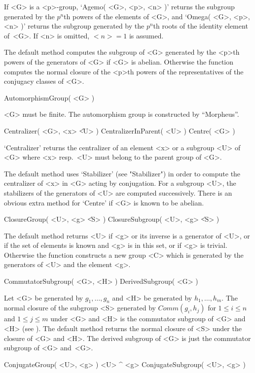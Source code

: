 If  <G> is a <p>-group,   `Agemo( <G>, <p>,   <n> )' returns the subgroup
generated by the $p^n$th powers of the  elements of <G>, and `Omega( <G>,
<p>, <n>  )' returns the  subgroup generated by  the $p^n$th roots of the
identity element of~<G>. If <n> is omitted, $<n>=1$ is assumed.

The  default method computes  the subgroup of <G>  generated by the <p>th
powers of the generators of <G> if <G> is abelian. Otherwise the function
computes the normal closure of the <p>th powers of the representatives of
the conjugacy classes of <G>.

\>AutomorphismGroup( <G> )

<G>   must be  finite.    The   automorphism group  is  constructed    by
``Morpheus''.

\>Centralizer( <G>, <x> \| <U> )
\>CentralizerInParent( <U> )
\>Centre( <G> )

`Centralizer' returns the centralizer of an element <x> or a subgroup <U>
of <G> where <x> resp.~<U> must belong to the parent group of <G>.

The  default  method uses  `Stabilizer'  (see  "Stabilizer") in  order to
compute  the  centralizer  of <x>  in  <G> acting  by conjugation.  For a
subgroup <U>,  the stabilizers of  the  generators  of <U>  are  computed
successively.  There is  an obvious extra  method for  `Centre' if <G> is
known to be abelian.

\>ClosureGroup( <U>, <g> \| <S> )
\>ClosureSubgroup( <U>, <g> \| <S> )

The default method returns  <U> if <g> or its  inverse is a generator  of
<U>, or if the set of elements is known and <g> is in this set, or if <g>
is trivial.  Otherwise the function  constructs a new  group <C> which is
generated by the generators of <U> and the element <g>.

\>CommutatorSubgroup( <G>, <H> )
\>DerivedSubgroup( <G> )

Let <G> be generated by $g_1, \ldots, g_n$ and  <H> be generated by $h_1,
\ldots, h_m$. The normal closure of the  subgroup <S> generated by $Comm(
g_i, h_j )$ for $1 \leq i \leq n$ and $1 \leq j \leq m$ under <G> and <H>
is the commutator subgroup  of  <G> and  <H> (see  \cite{Huppert67}). The
default method returns the normal closure of <S> under the closure of <G>
and <H>. The derived subgroup  of <G> is just  the commutator subgroup of
<G> and~<G>.

\>ConjugateGroup( <U>, <g> )
\)<U> ^ <g>
\>ConjugateSubgroup( <U>, <g> )

